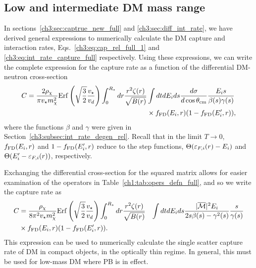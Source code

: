 \subsection{Low and intermediate DM mass range}
\label{ch3:subsec:captureintermediate}


In sections~\ref{ch3:sec:captrue_new_full} and \ref{ch3:sec:diff_int_rate}, we have derived general expressions to numerically calculate the DM capture and interaction rates,  
Eqs.~\ref{ch3:eq:cap_rel_full_1} and \ref{ch3:eq:int_rate_capture_full} respectively.   
Using these expressions, we can write 
the complete expression for the capture rate as a function of the differential DM-neutron cross-section 
\begin{equation}
    \begin{split}
        C = \frac{2\rho_\chi}{\pi v_\star m_\chi^2} {\rm Erf}\left(\sqrt{\frac{3}{2}}\frac{v_\star}{v_d}\right)\int_0^{R_\star}  dr  \frac{r^2\zeta(r)}{\sqrt{B(r)}} &\int dt dE_i ds \frac{d\sigma}{d\cos\theta_\mathrm{cm}}\frac{E_i s}{\beta(s)\gamma(s)}\\
        &\times f_{\rm FD}(E_i,r)(1-f_{\rm FD}(E_i',r)), 
    \end{split}
\label{ch3:eq:capturefinal}
\end{equation}
where the functions $\beta$ and $\gamma$ were given in Section~\ref{ch3:subsec:int_rate_degen_rel}. Recall that in the limit $T\rightarrow0$,  $f_{\rm FD}(E_i,r)$ and $1-f_{\rm FD}(E_i',r)$  reduce to the step functions,  $\Theta(\varepsilon_{F,i}(r)-E_i)$ and  $\Theta(E_i'-\varepsilon_{F,i}(r))$, respectively. 


Exchanging the differential cross-section for the squared matrix allows for easier examination of the operators in Table~\ref{ch1:tab:opers_defn_full}, and so we write the capture rate as
\begin{equation}
    \begin{split}
        C &=  \frac{\rho_\chi}{8\pi^2 v_\star m_\chi^2} {\rm Erf}\left(\sqrt{\frac{3}{2}}\frac{v_\star}{v_d}\right)\int_0^{R_\star}   dr  \frac{r^2 \zeta(r) }{\sqrt{B(r)}} & \int dt dE_i ds \frac{|\overline{\mathcal M}|^2 E_i}{2s\beta(s)-\gamma^2(s)} \frac{s}{\gamma(s)} \\
        &\times f_{\rm FD}(E_i,r)(1-f_{\rm FD}(E_i',r)). 
    \end{split}
    \label{ch3:eq:capturefinalM2}
\end{equation}
This expression can be used to numerically calculate the single scatter capture rate of DM in compact objects, in the optically thin regime. In general, this must be used for low-mass DM where PB is in effect.

